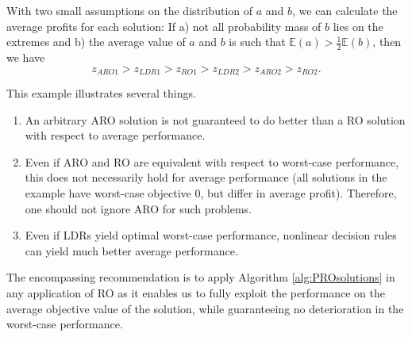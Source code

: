 With two small assumptions on the distribution of $a$ and $b$, we can calculate the average profits for each solution: If  a) not all probability mass of $b$ lies on the extremes  and b) the average value of $a$ and $b$ is such that $\mathbb{E}(a) > \frac{1}{2}\mathbb{E}(b)$, then we have
\[ z_{ARO1} > z_{LDR1} > z_{RO1} > z_{LDR2} >  z_{ARO2} >z_{RO2}. \] 

This example illustrates several things.
\begin{enumerate}
	\item An arbitrary ARO solution is not guaranteed to do better than a RO solution with respect to average performance.
	\item Even if ARO and RO are equivalent with respect to worst-case performance, this does not necessarily hold for average performance (all solutions in the example have worst-case objective 0, but differ in average profit). Therefore, one should not ignore ARO for such problems.
	\item Even if LDRs yield optimal worst-case performance, nonlinear decision rules can yield much better average performance.
\end{enumerate}

The encompassing recommendation is to apply Algorithm \ref{alg:PROsolutions} in any application of RO as it enables us to fully exploit the performance on the average objective value of the solution, while guaranteeing no deterioration in the worst-case performance.

